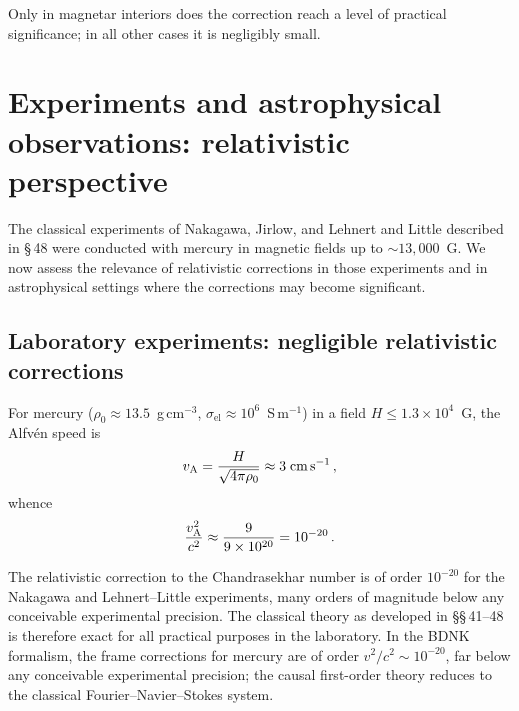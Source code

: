 Only in magnetar interiors does the correction reach a level of practical
significance; in all other cases it is negligibly small.

\section{Experiments and astrophysical observations: relativistic
  perspective}
\label{sec:rel-48}

The classical experiments of Nakagawa, Jirlow, and Lehnert and Little
described in \S\,48 were conducted with mercury in magnetic fields up
to $\sim\!13{,}000$~G.  We now assess the relevance of relativistic
corrections in those experiments and in astrophysical settings where the
corrections may become significant.

\subsection{Laboratory experiments: negligible relativistic corrections}
\label{subsec:rel-48-lab}

For mercury ($\rho_{0} \approx 13.5$~g\,cm$^{-3}$,
$\sigma_{\mathrm{el}} \approx 10^{6}$~S\,m$^{-1}$) in a field
$H \leq 1.3 \times 10^{4}$~G, the Alfv\'en speed is
\begin{equation}
  v_{\mathrm{A}} = \frac{H}{\sqrt{4\pi\rho_{0}}}
      \approx 3 \;\text{cm\,s}^{-1}\,,
  \label{eq:rel-vA-mercury}
\end{equation}
whence
\begin{equation}
  \frac{v_{\mathrm{A}}^{2}}{c^{2}}
  \approx \frac{9}{9 \times 10^{20}}
  = 10^{-20}\,.
  \label{eq:rel-vA-ratio-lab}
\end{equation}

\begin{relcorrection}
The relativistic correction to the Chandrasekhar number is of order
$10^{-20}$ for the Nakagawa and Lehnert--Little experiments, many
orders of magnitude below any conceivable experimental precision.  The
classical theory as developed in \S\S\,41--48 is therefore exact for all
practical purposes in the laboratory.  In the BDNK formalism, the
frame corrections for mercury are of order $v^{2}/c^{2}\sim 10^{-20}$,
far below any conceivable experimental precision; the causal first-order
theory reduces to the classical Fourier--Navier--Stokes system.
\end{relcorrection}

